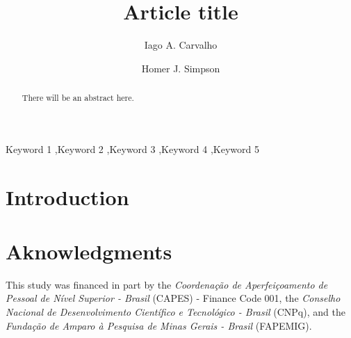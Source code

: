 \documentclass[preprint,review,12pt]{elsarticle}
\begin{document}
\begin{frontmatter}

            
\title{Article title}


\author[label1]{Iago A. Carvalho}

\author[label2]{Homer J. Simpson}

\address[label1]{Department of Computer Science, Universidade Federal de Minas Gerais}


\address[label2]{Twenty Century Fox, USA}

\begin{abstract}
There will be an abstract here.
\end{abstract}

\begin{keyword}
Keyword 1 \sep Keyword 2 \sep Keyword 3 \sep Keyword 4 \sep Keyword 5
\end{keyword}

\end{frontmatter}



\section{Introduction} \label{sec:intro}



\section*{Aknowledgments}
This study was financed in part by the \emph{Coordenação de Aperfeiçoamento de Pessoal de Nível Superior - Brasil} (CAPES) - Finance Code 001, the \emph{Conselho Nacional de Desenvolvimento Científico e Tecnológico - Brasil} (CNPq), and the \emph{Fundação de Amparo à Pesquisa de Minas Gerais - Brasil} (FAPEMIG).


% 
% 
% 
% 
% 
% 
% 
% 
% 
% 
% 
% 


\end{document}
